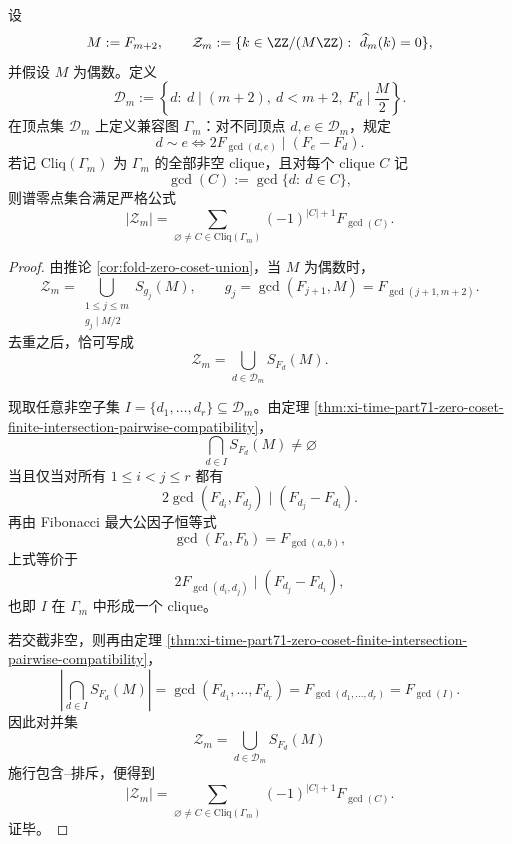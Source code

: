 \begin{theorem}\label{thm:xi-time-part71-zero-spectrum-weighted-clique-euler}
设
\[
M:=F_{m+2},
\qquad
\mathcal Z_m:=\{k\in \ZZ/(M\ZZ):\ \widehat d_m(k)=0\},
\]
并假设 \(M\) 为偶数。定义
\[
\mathcal D_m:=
\left\{
d:\ d\mid (m+2),\ d<m+2,\ F_d\mid \frac{M}{2}
\right\}.
\]
在顶点集 \(\mathcal D_m\) 上定义兼容图 \(\Gamma_m\)：对不同顶点 \(d,e\in\mathcal D_m\)，规定
\[
d\sim e
\iff
2F_{\gcd(d,e)}\mid (F_e-F_d).
\]
若记 \(\mathrm{Cliq}(\Gamma_m)\) 为 \(\Gamma_m\) 的全部非空 clique，且对每个 clique \(C\) 记
\[
\gcd(C):=\gcd\{d:\ d\in C\},
\]
则谱零点集合满足严格公式
\[
|\mathcal Z_m|
=
\sum_{\varnothing\neq C\in \mathrm{Cliq}(\Gamma_m)}
(-1)^{|C|+1}F_{\gcd(C)}.
\]
\end{theorem}
\begin{proof}
由推论 \ref{cor:fold-zero-coset-union}，当 \(M\) 为偶数时，
\[
\mathcal Z_m
=
\bigcup_{\substack{1\le j\le m\\ g_j\mid M/2}}S_{g_j}(M),
\qquad
g_j=\gcd(F_{j+1},M)=F_{\gcd(j+1,m+2)}.
\]
去重之后，恰可写成
\[
\mathcal Z_m=\bigcup_{d\in\mathcal D_m}S_{F_d}(M).
\]

现取任意非空子集 \(I=\{d_1,\dots,d_r\}\subseteq \mathcal D_m\)。由定理 \ref{thm:xi-time-part71-zero-coset-finite-intersection-pairwise-compatibility}，
\[
\bigcap_{d\in I}S_{F_d}(M)\neq\varnothing
\]
当且仅当对所有 \(1\le i<j\le r\) 都有
\[
2\gcd(F_{d_i},F_{d_j})\mid (F_{d_j}-F_{d_i}).
\]
再由 Fibonacci 最大公因子恒等式
\[
\gcd(F_a,F_b)=F_{\gcd(a,b)},
\]
上式等价于
\[
2F_{\gcd(d_i,d_j)}\mid (F_{d_j}-F_{d_i}),
\]
也即 \(I\) 在 \(\Gamma_m\) 中形成一个 clique。

若交截非空，则再由定理 \ref{thm:xi-time-part71-zero-coset-finite-intersection-pairwise-compatibility}，
\[
\left|
\bigcap_{d\in I}S_{F_d}(M)
\right|
=
\gcd(F_{d_1},\dots,F_{d_r})
=
F_{\gcd(d_1,\dots,d_r)}
=
F_{\gcd(I)}.
\]
因此对并集
\[
\mathcal Z_m=\bigcup_{d\in\mathcal D_m}S_{F_d}(M)
\]
施行包含--排斥，便得到
\[
|\mathcal Z_m|
=
\sum_{\varnothing\neq C\in \mathrm{Cliq}(\Gamma_m)}
(-1)^{|C|+1}F_{\gcd(C)}.
\]
证毕。
\end{proof}

